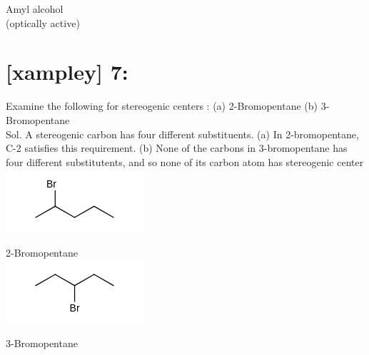 \documentclass[10pt]{article}
\begin{document}
Amyl alcohol\\
(optically active)

\section*{[xampley] 7:}
Examine the following for stereogenic centers : (a) 2-Bromopentane (b) 3-Bromopentane\\
Sol. A stereogenic carbon has four different substituents. (a) In 2-bromopentane, C-2 satisfies this requirement. (b) None of the carbons in 3-bromopentane has four different substitutents, and so none of its carbon atom has stereogenic center\\
\includegraphics{smile-fab6cc27c1af2b156622ce342fe999aedd17d267}

2-Bromopentane\\
\includegraphics{smile-ca5debec6800ee304a254e6fe1373a7631a04c74}

3-Bromopentane
\end{document}
